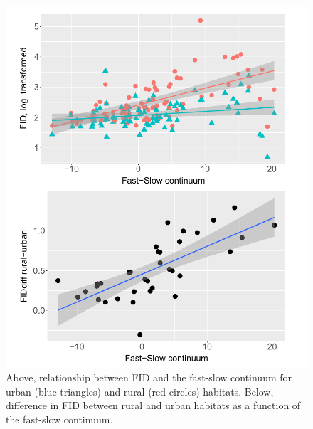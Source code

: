 \begin{figure}
\centering
\includegraphics[width=.75\textwidth]{./Figures/chapter04/Fig_4.png}
\caption[FID and fast-slow continuum]{Above, relationship between FID and the fast-slow continuum for
urban (blue triangles) and rural (red circles) habitats. Below, difference in
FID between rural and urban habitats as a function of the fast-slow continuum.}\label{fig:fig4.4}
\end{figure}


